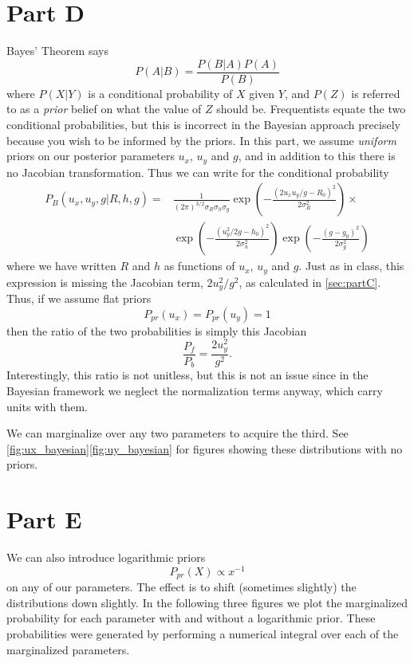 \documentclass[12pt,a4paper]{article}
\begin{document}
\section{Part D}
\label{sec:partD}
Bayes' Theorem says
\begin{equation}
  P(A|B) = \frac{P(B|A)P(A)}{P(B)}
\end{equation}
where $P(X|Y)$ is a conditional probability of $X$ given $Y$, and $P(Z)$ is 
referred to as a \textit{prior} belief on what the value of $Z$ should be.
Frequentists equate the two conditional probabilities, but this is incorrect
in the Bayesian approach precisely because you wish to be informed by the 
priors. In this part, we assume \textit{uniform} priors on our posterior
parameters $u_x$, $u_y$ and $g$, and in addition to this there is no Jacobian 
transformation. Thus we can write for the conditional probability
\begin{align}
  \label{eq:bayesian_conditional}
  P_B(u_x,u_y,g|R,h,g) = & \frac{1}{(2\pi)^{3/2}\sigma_R\sigma_h\sigma_g} \exp\left(-\frac{(2u_xu_y/g - R_0)^2}{2\sigma_R^2}\right)\times \\ &\exp\left(-\frac{(u_y^2/2g-h_0)^2}{2\sigma_h^2}\right) \exp\left(-\frac{(g-g_0)^2}{2\sigma_g^2}\right)
\end{align}
where we have written $R$ and $h$ as functions of $u_x$, $u_y$ and $g$. Just as in class,
this expression is missing the Jacobian term,
$2u_y^2/g^2$, as calculated in \autoref{sec:partC}. Thus, if we assume flat priors
\begin{equation}
  \label{eq:priors_partD}
  P_{pr}(u_x) = P_{pr}(u_y) = 1
\end{equation}
then the ratio of the two probabilities is simply this Jacobian
\begin{equation}
  \label{eq:prob_ratio}
  \frac{P_f}{P_b} = \frac{2u_y^2}{g^2}.
\end{equation}
Interestingly, this ratio is not unitless, 
but this is not an issue since in the Bayesian 
framework we neglect the normalization terms anyway, 
which carry units with them.

We can marginalize over any two parameters to acquire the third.
See \autoref{fig:ux_bayesian}\autoref{fig:uy_bayesian} for figures showing these distributions 
with no priors.

\section{Part E}
\label{sec:partE}
We can also introduce logarithmic priors
\begin{equation*}
  \label{eq:log_prior}
  P_{pr}(X) \propto x^{-1}
\end{equation*}
on any of our parameters. The effect is to shift (sometimes slightly)
the distributions down slightly. In the following three figures
we plot the marginalized probability for each parameter with and 
without a logarithmic prior. These probabilities were generated
by performing a numerical integral over each of the marginalized
parameters.
\end{document}
